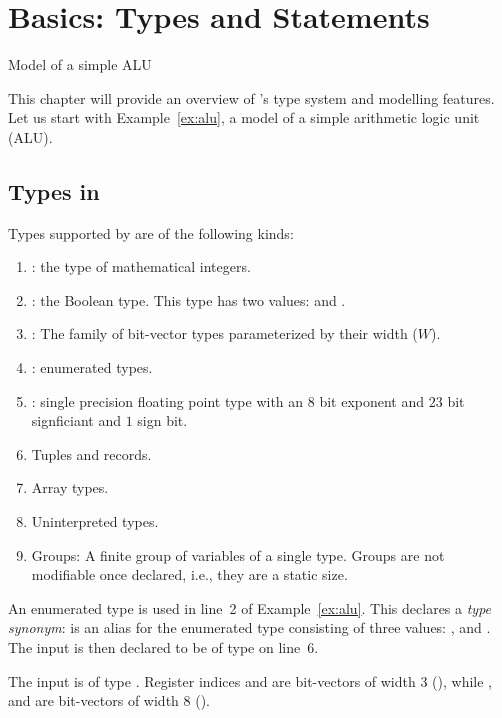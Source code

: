 \chapter{Basics: Types and Statements}
\begin{uclidlisting}[htbp]
    
    \caption{Model of a simple ALU}
\label{ex:alu}
\end{uclidlisting}

This chapter will provide an overview of \uclid{}'s type system and modelling features. Let us start with Example~\ref{ex:alu}, a model of a simple arithmetic logic unit (ALU).

\section{Types in \uclid{}}

Types supported by \uclid{} are of the following kinds:
\begin{enumerate}
    \item {}: the type of mathematical integers.
    \item {}: the Boolean type. This type has two values:  and .
    \item {}: The family of bit-vector types parameterized by their width ($W$).
    \item {}: enumerated types.
    \item {}: single precision floating point type with an $8$ bit exponent and $23$ bit signficiant and $1$ sign bit.
    \item Tuples and records.
    \item Array types.
    \item Uninterpreted types.
    \item Groups: A finite group of variables of a single type. Groups are not modifiable once declared, i.e., they are a static size. 
\end{enumerate}

An enumerated type is used in line~2 of Example~\ref{ex:alu}. This declares a \textit{type synonym}:  is an alias for the enumerated type consisting of three values: ,  and . The input  is then declared to be of type  on line~6.

The input  is of type . Register indices  and  are bit-vectors of width 3 (), while ,  and  are bit-vectors of width 8 ().

